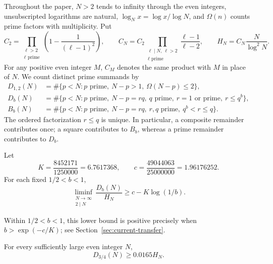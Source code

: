 Throughout the paper, $N>2$ tends to infinity through the even integers,
unsubscripted logarithms are natural, $\log_N x=\log x/\log N$,
and $\Omega(n)$ counts prime factors with multiplicity. Put
\begin{equation}
 C_2=\prod_{\substack{\ell>2\\\ell\text{ prime}}}
 \left(1-\frac1{(\ell-1)^2}\right),\qquad
 C_N=C_2\prod_{\substack{\ell\mid N,\ \ell>2\\\ell\text{ prime}}}
 \frac{\ell-1}{\ell-2},\qquad
 H_N=C_N\frac{N}{\log^2 N}.
 \label{eq:current-normalization}
\end{equation}
For any positive even integer $M$, $C_M$ denotes the same product with $M$ in place of $N$.
We count distinct prime summands by
\begin{align}
 D_{1,2}(N)&=\#\{p<N:p\text{ prime},\ N-p>1,
                                      \ \Omega(N-p)\le2\},
                                      \label{eq:current-d12}\\
 D_b(N)&=\#\{p<N:p\text{ prime},\ N-p=rq,
       \ q\text{ prime},\ r=1\text{ or prime},\ r\le q^b\},
                                      \label{eq:current-db}\\
 B_b(N)&=\#\{p<N:p\text{ prime},\ N-p=rq,
                \ r,q\text{ prime},\ q^b<r\le q\}.
                                      \label{eq:current-bb}
\end{align}
The ordered factorization $r\le q$ is unique. In particular, a composite
remainder contributes once; a square contributes to $B_b$, whereas a prime
remainder contributes to $D_b$.

\begin{theorem}
\label{thm:current-main}
Let
\begin{equation}
 K=\frac{8452171}{1250000}=6.7617368,
 \qquad c=\frac{49044063}{25000000}=1.96176252.
 \label{eq:current-safe-constants}
\end{equation}
For each fixed $1/2<b<1$,
\begin{equation}
 \liminf_{\substack{N\to\infty\\2\mid N}}
      \frac{D_b(N)}{H_N}\ge c-K\log(1/b).
 \label{eq:current-general-theorem}
\end{equation}
\end{theorem}

Within $1/2<b<1$, this lower bound is positive precisely when
$b>\exp(-c/K)$; see Section~\ref{sec:current-transfer}.

\begin{corollary}
\label{cor:three-quarters}
For every sufficiently large even integer $N$,
\[
                  D_{3/4}(N)\ge0.0165H_N.
\]
\end{corollary}

